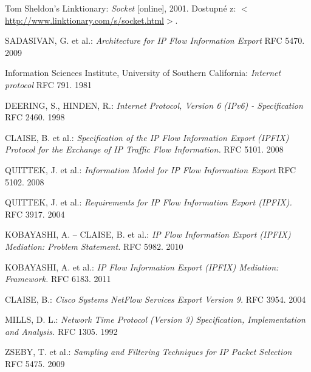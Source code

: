 \begin{thebibliography}{999}

Tom Sheldon's Linktionary: \emph{Socket} [online], 2001. Dostupné 
z: $<$\url{http://www.linktionary.com/s/socket.html}$>$.


SADASIVAN, G. et al.: \emph{Architecture for IP Flow Information Export} 
RFC 5470. 2009

Information Sciences Institute, University of Southern California: \emph{Internet protocol} 
RFC 791. 1981

DEERING, S., HINDEN, R.: \emph{Internet Protocol, Version 6 (IPv6) - Specification} 
RFC 2460. 1998

CLAISE, B. et al.: \emph{Specification of the IP Flow Information Export 
(IPFIX) Protocol for the Exchange of IP Traffic Flow Information.} 
RFC 5101. 2008

QUITTEK, J. et al.: \emph{Information Model for IP Flow Information Export} 
RFC 5102. 2008

QUITTEK, J. et al.: \emph{Requirements for IP Flow Information Export (IPFIX).} 
RFC 3917. 2004

KOBAYASHI, A. -- CLAISE, B. et al.: \emph{IP Flow Information Export (IPFIX) Mediation: Problem Statement.} 
RFC 5982. 2010

KOBAYASHI, A. et al.: \emph{IP Flow Information Export (IPFIX) Mediation: Framework.} 
RFC 6183. 2011

CLAISE, B.: \emph{Cisco Systems NetFlow Services Export Version 9.} 
RFC 3954. 2004

MILLS, D. L.: \emph{Network Time Protocol (Version 3) Specification, Implementation and Analysis.} 
RFC 1305. 1992

ZSEBY, T. et al.: \emph{Sampling and Filtering Techniques for IP Packet Selection} 
RFC 5475. 2009



\end{thebibliography}
